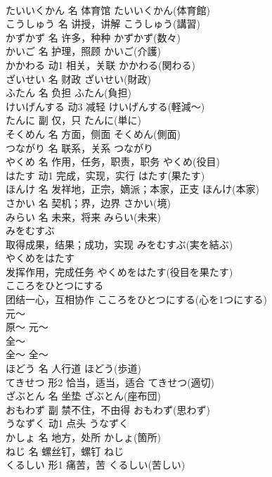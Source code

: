 \documentclass[8pt]{extreport}
\begin{document}
\begin{CJK}{UTF8}{min}
\\	たいいくかん	名	体育馆	たいいくかん(体育館)	
\\	こうしゅう	名	讲授，讲解	こうしゅう(講習)	
\\	かずかず	名	许多，种种	かずかず(数々)	
\\	かいご	名	护理，照顾	かいご(介護)	
\\	かかわる	动1	相关，关联	かかわる(関わる)	
\\	ざいせい	名	财政	ざいせい(財政)	
\\	ふたん	名	负担	ふたん(負担)	
\\	けいげんする	动3	减轻	けいげんする(軽減～)	
\\	たんに	副	仅，只	たんに(単に)	
\\	そくめん	名	方面，侧面	そくめん(側面)	
\\	つながり	名	联系，关系	つながり	
\\	やくめ	名	作用，任务，职责，职务	やくめ(役目)	
\\	はたす	动1	完成，实现，实行	はたす(果たす)	
\\	ほんけ	名	发祥地，正宗，嫡派；本家，正支	ほんけ(本家)	
\\	さかい	名	契机；界，边界	さかい(境)	
\\	みらい	名	未来，将来	みらい(未来)	
\\	みをむすぶ	
\\	取得成果，结果；成功，实现	みをむすぶ(実を結ぶ)	
\\	やくめをはたす	
\\	发挥作用，完成任务	やくめをはたす(役目を果たす)	
\\	こころをひとつにする	
\\	团结一心，互相协作	こころをひとつにする(心を1つにする)	
\\	元～	
\\	原～	元～	
\\	全～	
\\	全～	全～	
\\	ほどう	名	人行道	ほどう(歩道)	
\\	てきせつ	形2	恰当，适当，适合	てきせつ(適切)	
\\	ざぶとん	名	坐垫	ざぶとん(座布団)	
\\	おもわず	副	禁不住，不由得	おもわず(思わず)	
\\	うなずく	动1	点头	うなずく	
\\	かしょ	名	地方，处所	かしょ(箇所)	
\\	ねじ	名	螺丝钉，螺钉	ねじ	
\\	くるしい	形1	痛苦，苦	くるしい(苦しい)	

\end{CJK}
\end{document}
